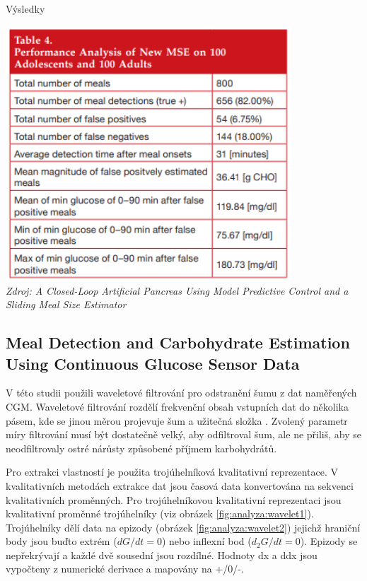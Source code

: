 \begin{table}[H]
\caption{Výsledky}
\label{tab:analyza:threshold3}
\centering
\includegraphics[width=0.8\textwidth]{img/analyzaCHO/threshold3.png}\\
\textit{Zdroj: A Closed-Loop Artificial Pancreas Using Model Predictive Control and a Sliding Meal Size Estimator \citep{analyzaCHO.Thresholds}}
\end{table}


\subsection{Meal Detection and Carbohydrate Estimation Using Continuous Glucose Sensor Data}
\label{ch:analyzaCHO:wavelet}

V této studii \citet{analyzaCHO.WaveletEst} použili waveletové filtrování pro odstranění šumu z dat naměřených CGM. Waveletové filtrování rozdělí frekvenční obsah vstupních dat do několika pásem, kde se jinou měrou projevuje šum a užitečná složka \citep{analyzaCHO.Wavelet}. Zvolený parametr míry filtrování musí být dostatečně velký, aby odfiltroval šum, ale ne přiliš, aby se neodfiltrovaly ostré nárůsty způsobené příjmem karbohydrátů.

Pro extrakci vlastností je použita trojúhelníková kvalitativní reprezentace. V kvalitativních metodách extrakce dat jsou časová data konvertována na sekvenci kvalitativních proměnných. Pro trojúhelníkovou kvalitativní reprezentaci jsou kvalitativní proměnné trojúhelníky (viz obrázek \ref{fig:analyza:wavelet1}). Trojúhelníky dělí data na epizody (obrázek \ref{fig:analyza:wavelet2}) jejichž hraniční body jsou buďto extrém ($dG/dt=0$) nebo inflexní bod ($d_{2}G/dt=0$). Epizody se nepřekrývají a každé dvě sousední jsou rozdílné. Hodnoty dx a ddx jsou vypočteny z numerické derivace a mapovány na +/0/-.

